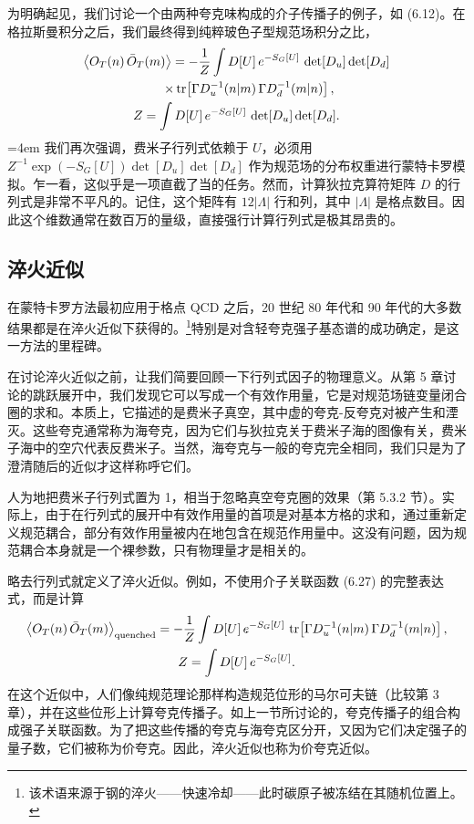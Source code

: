 为明确起见，我们讨论一个由两种夸克味构成的介子传播子的例子，如 (6.12)。在格拉斯曼积分之后，我们最终得到纯粹玻色子型规范场积分之比，
\begin{equation}
  \begin{gathered}
    \big\langle O_T(n)\, \bar{O}_T(m) \big\rangle
    = -\frac{1}{Z}\int D[U]\, e^{-S_G[U]}\, \det[D_u]\det[D_d] \\
    \qquad \times \operatorname{tr}\!\left[ \Gamma D_u^{-1}(n|m)\, \Gamma D_d^{-1}(m|n) \right], \\
    Z = \int D[U]\, e^{-S_G[U]}\, \det[D_u]\det[D_d] .
  \end{gathered}
\end{equation}
\begingroup\emergencystretch=4em 我们再次强调，费米子行列式依赖于 $U$，必须用\linebreak[0] $Z^{-1}\exp(-S_G[U])\allowbreak\det[D_u]\allowbreak\det[D_d]$ 作为规范场的分布权重进行蒙特卡罗模拟。乍一看，这似乎是一项直截了当的任务。然而，计算狄拉克算符矩阵 $D$ 的行列式是非常不平凡的。记住，这个矩阵有 $12|\Lambda|$ 行和列，其中 $|\Lambda|$ 是格点数目。因此这个维数通常在数百万的量级，直接强行计算行列式是极其昂贵的。\par\endgroup

\subsection{淬火近似}

在蒙特卡罗方法最初应用于格点 QCD 之后，20 世纪 80 年代和 90 年代的大多数结果都是在淬火近似下获得的。\footnote{该术语来源于钢的淬火——快速冷却——此时碳原子被冻结在其随机位置上。}特别是对含轻夸克强子基态谱的成功确定，是这一方法的里程碑。

在讨论淬火近似之前，让我们简要回顾一下行列式因子的物理意义。从第 5 章讨论的跳跃展开中，我们发现它可以写成一个有效作用量，它是对规范场链变量闭合圈的求和。本质上，它描述的是费米子真空，其中虚的夸克-反夸克对被产生和湮灭。这些夸克通常称为海夸克，因为它们与狄拉克关于费米子海的图像有关，费米子海中的空穴代表反费米子。当然，海夸克与一般的夸克完全相同，我们只是为了澄清随后的近似才这样称呼它们。

人为地把费米子行列式置为 1，相当于忽略真空夸克圈的效果（第 5.3.2 节）。实际上，由于在行列式的展开中有效作用量的首项是对基本方格的求和，通过重新定义规范耦合，部分有效作用量被内在地包含在规范作用量中。这没有问题，因为规范耦合本身就是一个裸参数，只有物理量才是相关的。

略去行列式就定义了淬火近似。例如，不使用介子关联函数 (6.27) 的完整表达式，而是计算
\begin{equation}
  \begin{gathered}
    \big\langle O_T(n)\, \bar{O}_T(m) \big\rangle_{\mathrm{quenched}}
    = -\frac{1}{Z}\int D[U]\, e^{-S_G[U]}\,
      \operatorname{tr}\!\left[ \Gamma D_u^{-1}(n|m)\, \Gamma D_d^{-1}(m|n) \right], \\
    Z = \int D[U]\, e^{-S_G[U]} .
  \end{gathered}
\end{equation}
在这个近似中，人们像纯规范理论那样构造规范位形的马尔可夫链（比较第 3 章），并在这些位形上计算夸克传播子。如上一节所讨论的，夸克传播子的组合构成强子关联函数。为了把这些传播的夸克与海夸克区分开，又因为它们决定强子的量子数，它们被称为价夸克。因此，淬火近似也称为价夸克近似。


